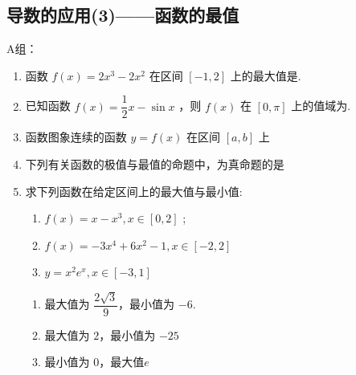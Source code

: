 \subsection*{导数的应用(3)——函数的最值}

A组：
\begin{enumerate}
    \item 函数 $f\left( x\right)  = 2{x}^{3} - 2{x}^{2}$ 在区间 $\left\lbrack  {-1,2}\right\rbrack$ 上的最大值是.

    \item 已知函数 $f\left( x\right)  = \dfrac{1}{2}x - \sin x$ ，则 $f\left( x\right)$ 在 $\left\lbrack  {0,\pi }\right\rbrack$ 上的值域为.

    \item 函数图象连续的函数 $y = f\left( x\right)$ 在区间 $\left\lbrack  {a,b}\right\rbrack$ 上
    
    \item 下列有关函数的极值与最值的命题中，为真命题的是

    \item 求下列函数在给定区间上的最大值与最小值:
    \begin{enumerate}
        \item $f\left( x\right)  = x - {x}^{3},x \in  \left\lbrack  {0,2}\right\rbrack$ ; 
        
        \item $f\left( x\right)  =  - 3{x}^{4} + 6{x}^{2} - 1,x \in  \left\lbrack  {-2,2}\right\rbrack$

        \item $y = {x}^{2}{e}^{x},x \in  \left\lbrack  {-3,1}\right\rbrack$
    \end{enumerate}
    \begin{jieda}
        \begin{enumerate}
            \item 最大值为 $\dfrac{2\sqrt{3}}{9}$，最小值为 $-6$.
            \item 最大值为 $2$，最小值为 $-25$
            \item 最小值为 $0$，最大值$e$
        \end{enumerate}
    \end{jieda}
\end{enumerate}

